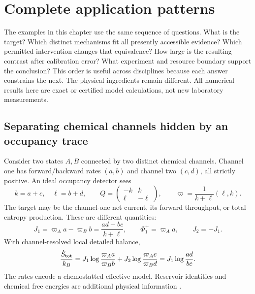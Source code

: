\chapter{Complete application patterns}
\label{ch:applications}

The examples in this chapter use the same sequence of questions. What is the
target? Which distinct mechanisms fit all presently accessible evidence?
Which permitted intervention changes that equivalence? How large is the
resulting contrast after calibration error? What experiment and resource
boundary support the conclusion? This order is useful across disciplines
because each answer constrains the next. The physical ingredients remain
different. All numerical results here are exact or certified model
calculations, not new laboratory measurements.

\section{Separating chemical channels hidden by an occupancy trace}
\label{sec:applications-chemistry}

Consider two states $A,B$ connected by two distinct chemical channels.
Channel one has forward/backward rates $(a,b)$ and channel two $(c,d)$,
all strictly positive. An ideal occupancy detector sees
\begin{equation}
 k=a+c,\quad \ell=b+d,\qquad
 Q=\begin{pmatrix}-k&k\\\ell&-\ell\end{pmatrix},\qquad
 \varpi=\frac1{k+\ell}(\ell,k).
 \label{eq:applications-chemical-model}
\end{equation}
The target may be the channel-one net current, its forward throughput, or
total entropy production. These are different quantities:
\begin{equation}
 J_1=\varpi_Aa-\varpi_Bb=\frac{ad-bc}{k+\ell},\qquad
 \Phi_1^+=\varpi_Aa,\qquad J_2=-J_1.
\end{equation}
With channel-resolved local detailed balance,
\begin{equation}
 \frac{\dot S_{\rm tot}}{k_B}
   =J_1\log\frac{\varpi_Aa}{\varpi_Bb}
    +J_2\log\frac{\varpi_Ac}{\varpi_Bd}
   =J_1\log\frac{ad}{bc}.
 \label{eq:applications-chemical-entropy}
\end{equation}
The rates encode a chemostatted effective model. Reservoir identities and
chemical free energies are additional physical information
\cite{physics-rao}.

